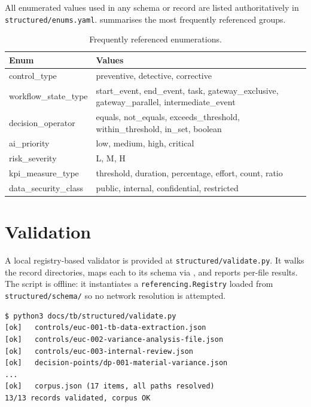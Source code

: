 All enumerated values used in any schema or record are listed
authoritatively in \corpus\texttt{structured/enums.yaml}.
 summarises the most frequently referenced groups.

\begin{table}[htbp]
\caption{Frequently referenced enumerations.}\label{tab:enums}
\centering
\small
\begin{tabularx}{\linewidth}{@{}lX@{}}
\toprule
\textbf{Enum} & \textbf{Values} \\ \midrule
control\_type        & preventive, detective, corrective \\
workflow\_state\_type & start\_event, end\_event, task, gateway\_exclusive, gateway\_parallel, intermediate\_event \\
decision\_operator   & equals, not\_equals, exceeds\_threshold, within\_threshold, in\_set, boolean \\
ai\_priority         & low, medium, high, critical \\
risk\_severity       & L, M, H \\
kpi\_measure\_type    & threshold, duration, percentage, effort, count, ratio \\
data\_security\_class & public, internal, confidential, restricted \\
\bottomrule
\end{tabularx}
\end{table}

\section{Validation}

A local registry-based validator is provided at
\corpus\texttt{structured/validate.py}. It walks the record
directories, maps each to its schema via
, and reports per-file results. The script is
offline: it instantiates a \texttt{referencing.Registry} loaded from
\corpus\texttt{structured/schema/} so no network resolution is
attempted.

\begin{lstlisting}[caption={Running the validator.},label=lst:validate]
$ python3 docs/tb/structured/validate.py
[ok]   controls/euc-001-tb-data-extraction.json
[ok]   controls/euc-002-variance-analysis-file.json
[ok]   controls/euc-003-internal-review.json
[ok]   decision-points/dp-001-material-variance.json
...
[ok]   corpus.json (17 items, all paths resolved)
13/13 records validated, corpus OK
\end{lstlisting}

